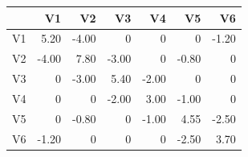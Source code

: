 \begin{tabular}{lrrrrrr}
\toprule
 & V1 & V2 & V3 & V4 & V5 & V6 \\
\midrule
V1 & 5.20 & -4.00 & 0 & 0 & 0 & -1.20 \\
V2 & -4.00 & 7.80 & -3.00 & 0 & -0.80 & 0 \\
V3 & 0 & -3.00 & 5.40 & -2.00 & 0 & 0 \\
V4 & 0 & 0 & -2.00 & 3.00 & -1.00 & 0 \\
V5 & 0 & -0.80 & 0 & -1.00 & 4.55 & -2.50 \\
V6 & -1.20 & 0 & 0 & 0 & -2.50 & 3.70 \\
\bottomrule
\end{tabular}
